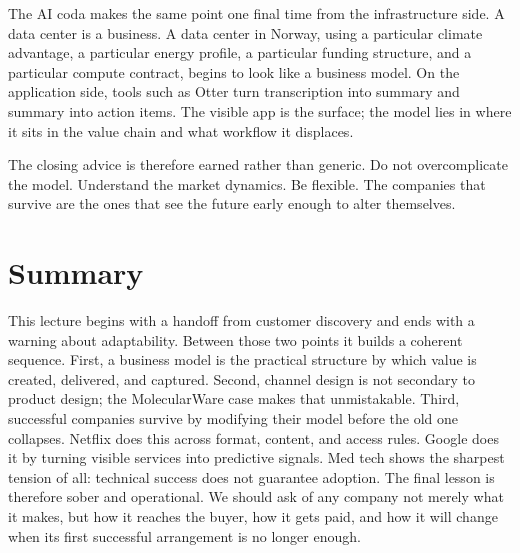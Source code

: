 The AI coda makes the same point one final time from the infrastructure side. A data center is a business. A data center in Norway, using a particular climate advantage, a particular energy profile, a particular funding structure, and a particular compute contract, begins to look like a business model. On the application side, tools such as Otter turn transcription into summary and summary into action items. The visible app is the surface; the model lies in where it sits in the value chain and what workflow it displaces.

The closing advice is therefore earned rather than generic. Do not overcomplicate the model. Understand the market dynamics. Be flexible. The companies that survive are the ones that see the future early enough to alter themselves.

\section{Summary}

This lecture begins with a handoff from customer discovery and ends with a warning about adaptability. Between those two points it builds a coherent sequence. First, a business model is the practical structure by which value is created, delivered, and captured. Second, channel design is not secondary to product design; the MolecularWare case makes that unmistakable. Third, successful companies survive by modifying their model before the old one collapses. Netflix does this across format, content, and access rules. Google does it by turning visible services into predictive signals. Med tech shows the sharpest tension of all: technical success does not guarantee adoption. The final lesson is therefore sober and operational. We should ask of any company not merely what it makes, but how it reaches the buyer, how it gets paid, and how it will change when its first successful arrangement is no longer enough.